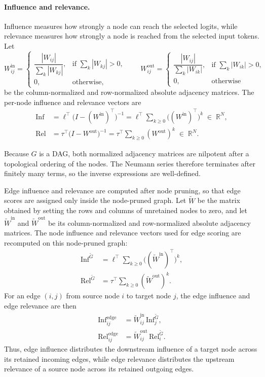 \documentclass[../main.tex]{subfiles}
\begin{document}
\paragraph{Influence and relevance.}
Influence measures how strongly a node can reach the selected logits, while
relevance measures how strongly a node is reached from the selected input tokens.
Let
\[
W^{\text{in}}_{ij} =
\begin{cases}
\dfrac{|W_{ij}|}{\sum_k |W_{kj}|}, & \text{if } \sum_k |W_{kj}| > 0,\\
0, & \text{otherwise,}
\end{cases}
\qquad
W^{\text{out}}_{ij} =
\begin{cases}
\dfrac{|W_{ij}|}{\sum_k |W_{ik}|}, & \text{if } \sum_k |W_{ik}| > 0,\\
0, & \text{otherwise}
\end{cases}
\]
be the column-normalized and row-normalized absolute adjacency matrices. The
per-node influence and relevance vectors are
\begin{align}
\mathrm{Inf} &= \ell^\top \bigl(I - (W^{\text{in}})^\top\bigr)^{-1}
= \ell^\top \sum_{k \ge 0} \bigl((W^{\text{in}})^\top\bigr)^k
\;\in\; \mathbb{R}^N, \label{eq:inf}\\
\mathrm{Rel} &= \tau^\top \bigl(I - W^{\text{out}}\bigr)^{-1}
= \tau^\top \sum_{k \ge 0} (W^{\text{out}})^k
\;\in\; \mathbb{R}^N. \label{eq:rel}
\end{align}

Because $G$ is a DAG, both normalized adjacency matrices are nilpotent after a
topological ordering of the nodes. The Neumann series therefore terminates after
finitely many terms, so the inverse expressions are well-defined.

Edge influence and relevance are computed after node pruning, so that edge
scores are assigned only inside the node-pruned graph. Let $\widetilde{W}$ be the
matrix obtained by setting the rows and columns of unretained nodes to zero, and
let $\widetilde{W}^{\text{in}}$ and $\widetilde{W}^{\text{out}}$ be its
column-normalized and row-normalized absolute adjacency matrices. The node
influence and relevance vectors used for edge scoring are recomputed on this
node-pruned graph:
\begin{align}
\mathrm{Inf}^{\widetilde{G}}
&= \ell^\top \sum_{k \ge 0}
\bigl((\widetilde{W}^{\text{in}})^\top\bigr)^k, \nonumber\\
\mathrm{Rel}^{\widetilde{G}}
&= \tau^\top \sum_{k \ge 0}
(\widetilde{W}^{\text{out}})^k . \nonumber
\end{align}
For an edge $(i,j)$ from source node $i$ to target node $j$, the edge influence
and edge relevance are then
\begin{align}
\mathrm{Inf}^{\text{edge}}_{ij}
&= \widetilde{W}^{\text{in}}_{ij}\,
\mathrm{Inf}^{\widetilde{G}}_j, \label{eq:edge-inf}\\
\mathrm{Rel}^{\text{edge}}_{ij}
&= \widetilde{W}^{\text{out}}_{ij}\,
\mathrm{Rel}^{\widetilde{G}}_i. \label{eq:edge-rel}
\end{align}
Thus, edge influence distributes the downstream influence of a target node across
its retained incoming edges, while edge relevance distributes the upstream
relevance of a source node across its retained outgoing edges.
\end{document}
